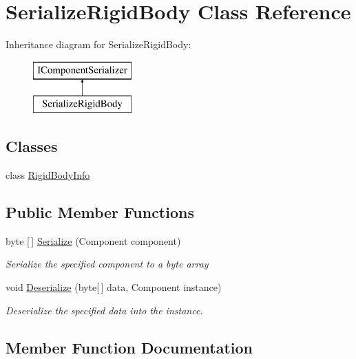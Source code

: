 \hypertarget{class_serialize_rigid_body}{}\section{Serialize\+Rigid\+Body Class Reference}
\label{class_serialize_rigid_body}
Inheritance diagram for Serialize\+Rigid\+Body\+:\begin{figure}[H]
\begin{center}
\leavevmode
\includegraphics[height=2.000000cm]{class_serialize_rigid_body}
\end{center}
\end{figure}
\subsection*{Classes}
\begin{DoxyCompactItemize}
\item 
class \hyperlink{class_serialize_rigid_body_1_1_rigid_body_info}{Rigid\+Body\+Info}
\end{DoxyCompactItemize}
\subsection*{Public Member Functions}
\begin{DoxyCompactItemize}
\item 
byte \mbox{[}$\,$\mbox{]} \hyperlink{class_serialize_rigid_body_a5b70b8af5b0b775bc961eb553a36b438}{Serialize} (Component component)
\begin{DoxyCompactList}\small\item\em Serialize the specified component to a byte array \end{DoxyCompactList}\item 
void \hyperlink{class_serialize_rigid_body_a5d6e7d0282184b45b23d579b872e89a2}{Deserialize} (byte\mbox{[}$\,$\mbox{]} data, Component instance)
\begin{DoxyCompactList}\small\item\em Deserialize the specified data into the instance. \end{DoxyCompactList}\end{DoxyCompactItemize}


\subsection{Member Function Documentation}
\mbox{\label{class_serialize_rigid_body_a5d6e7d0282184b45b23d579b872e89a2}} 
